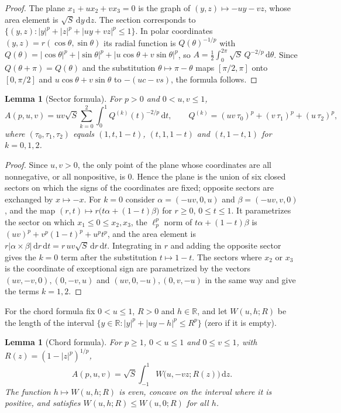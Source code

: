 \documentclass[11pt]{amsart}
\newtheorem{lemma}[theorem]{Lemma}
\theoremstyle{definition}
\theoremstyle{remark}
\numberwithin{equation}{section}
\newcommand{\R}{\mathbb{R}}
\newcommand{\dd}{\,\mathrm{d}}
\begin{document}
\begin{proof}
The plane $x_1+ux_2+vx_3=0$ is the graph of $(y,z)\mapsto -uy-vz$, whose area element is $\sqrt S\dd y\dd z$. The section corresponds to $\{(y,z):|y|^p+|z|^p+|uy+vz|^p\le1\}$. In polar coordinates $(y,z)=r(\cos\theta,\sin\theta)$ its radial function is $Q(\theta)^{-1/p}$ with $Q(\theta)=|\cos\theta|^p+|\sin\theta|^p+|u\cos\theta+v\sin\theta|^p$, so $A=\tfrac12\int_0^{2\pi}\sqrt S\,Q^{-2/p}\dd\theta$. Since $Q(\theta+\pi)=Q(\theta)$ and the substitution $\theta\mapsto\pi-\theta$ maps $[\pi/2,\pi]$ onto $[0,\pi/2]$ and $u\cos\theta+v\sin\theta$ to $-(uc-vs)$, the formula follows.
\end{proof}

\begin{lemma}[Sector formula]\label{lem:sector}
For $p>0$ and $0<u,v\le 1$,
\begin{equation}\label{eq:sector}
A(p,u,v)=uv\sqrt S\sum_{k=0}^{2}\int_0^1 Q^{(k)}(t)^{-2/p}\dd t,\qquad
Q^{(k)}=(uv\,\tau_0)^p+(v\,\tau_1)^p+(u\,\tau_2)^p,
\end{equation}
where $(\tau_0,\tau_1,\tau_2)$ equals $(1,t,1-t)$, $(t,1,1-t)$ and $(t,1-t,1)$ for $k=0,1,2$.
\end{lemma}

\begin{proof}
Since $u,v>0$, the only point of the plane whose coordinates are all nonnegative, or all nonpositive, is $0$. Hence the plane is the union of six closed sectors on which the signs of the coordinates are fixed; opposite sectors are exchanged by $x\mapsto -x$. For $k=0$ consider $\alpha=(-uv,0,u)$ and $\beta=(-uv,v,0)$, and the map $(r,t)\mapsto r\bigl(t\alpha+(1-t)\beta\bigr)$ for $r\ge0$, $0\le t\le 1$. It parametrizes the sector on which $x_1\le0\le x_2,x_3$, the $\ell_p^p$ norm of $t\alpha+(1-t)\beta$ is $(uv)^p+v^p(1-t)^p+u^pt^p$, and the area element is $r|\alpha\times\beta|\dd r\dd t=r\,uv\sqrt S\dd r\dd t$. Integrating in $r$ and adding the opposite sector gives the $k=0$ term after the substitution $t\mapsto 1-t$. The sectors where $x_2$ or $x_3$ is the coordinate of exceptional sign are parametrized by the vectors $(uv,-v,0),(0,-v,u)$ and $(uv,0,-u),(0,v,-u)$ in the same way and give the terms $k=1,2$.
\end{proof}

For the chord formula fix $0<u\le1$, $R>0$ and $h\in\R$, and let $W(u,h;R)$ be the length of the interval $\{y\in\R:|y|^p+|uy-h|^p\le R^p\}$ (zero if it is empty).

\begin{lemma}[Chord formula]\label{lem:chord}
For $p\ge1$, $0<u\le1$ and $0\le v\le 1$, with $R(z)=(1-|z|^p)^{1/p}$,
\begin{equation}\label{eq:chord}
A(p,u,v)=\sqrt S\int_{-1}^1 W\bigl(u,-vz;R(z)\bigr)\dd z.
\end{equation}
The function $h\mapsto W(u,h;R)$ is even, concave on the interval where it is positive, and satisfies $W(u,h;R)\le W(u,0;R)$ for all $h$.
\end{lemma}
\end{document}
